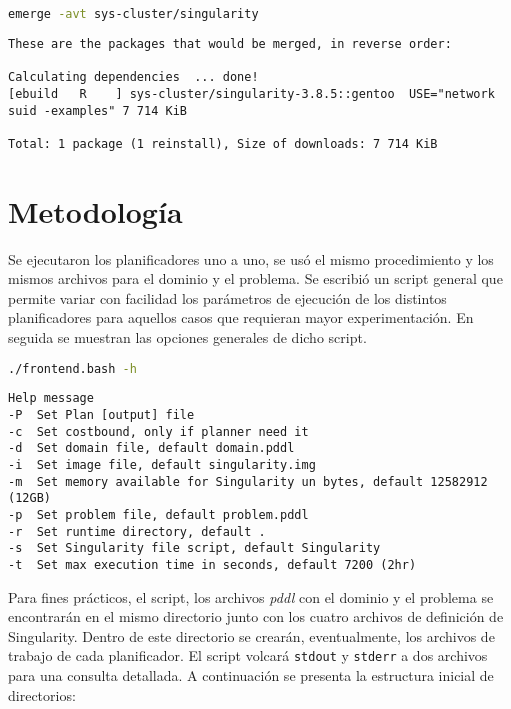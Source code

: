\documentclass[a4paper,12pt,twocolumn]{article}
\begin{document}
\begin{lstlisting}[language=sh]
  emerge -avt sys-cluster/singularity
\end{lstlisting}
\begin{lstlisting}[style=consola]
  These are the packages that would be merged, in reverse order:

Calculating dependencies  ... done!
[ebuild   R    ] sys-cluster/singularity-3.8.5::gentoo  USE="network suid -examples" 7 714 KiB

Total: 1 package (1 reinstall), Size of downloads: 7 714 KiB
\end{lstlisting}

\section{Metodología}

Se ejecutaron los planificadores uno a uno, se usó el mismo procedimiento y los mismos archivos para el dominio y el problema. Se escribió un script general que permite variar con facilidad los parámetros de ejecución de los distintos planificadores para aquellos casos que requieran mayor experimentación. En seguida se muestran las opciones generales de dicho script.

\begin{lstlisting}[language=sh]
  ./frontend.bash -h  
\end{lstlisting}

\begin{lstlisting}[style=consola]
Help message
-P  Set Plan [output] file
-c  Set costbound, only if planner need it
-d  Set domain file, default domain.pddl
-i  Set image file, default singularity.img
-m  Set memory available for Singularity un bytes, default 12582912 (12GB)
-p  Set problem file, default problem.pddl
-r  Set runtime directory, default .
-s  Set Singularity file script, default Singularity
-t  Set max execution time in seconds, default 7200 (2hr)
\end{lstlisting}

Para fines prácticos, el script, los archivos \emph{pddl} con el dominio y el problema se encontrarán en el mismo directorio junto con los cuatro archivos de definición de Singularity\citep[sec. Interact with images]{Sylabs_2021}. Dentro de este directorio se crearán, eventualmente, los archivos de trabajo de cada planificador.  El script volcará \texttt{stdout} y \texttt{stderr} a dos archivos para una consulta detallada. A continuación se presenta la estructura inicial de directorios:
\end{document}
